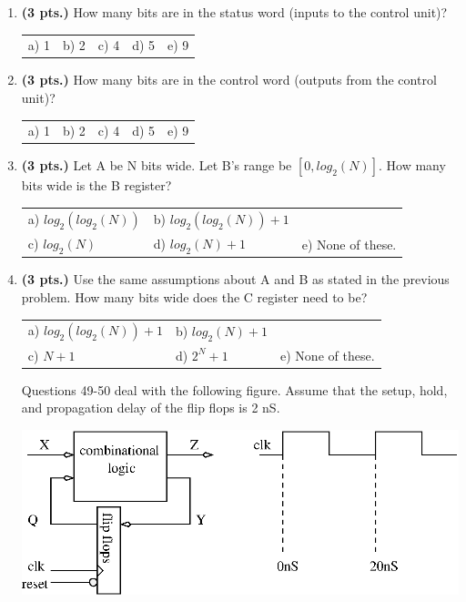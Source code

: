 \documentclass{article}
\begin{document}
\begin{enumerate}
\pagebreak
\item{\bf (3 pts.)} How many bits are in the status word (inputs to the 
control unit)?

\begin{tabular}{p{0.75in}p{0.75in}p{0.75in}p{0.75in}p{0.75in}}
a) 1 & b) 2 & c) 4 & d) 5 & e) 9 \\
\end{tabular}

\item{\bf (3 pts.)} How many bits are in the control word (outputs from the 
control unit)?

\begin{tabular}{p{0.75in}p{0.75in}p{0.75in}p{0.75in}p{0.75in}}
a) 1 & b) 2 & c) 4 & d) 5 & e) 9 \\
\end{tabular}

\item {\bf (3 pts.)} Let A be N bits wide.  Let B's range be $[0,log_2(N)]$.
How many bits wide is the B register?

\begin{tabular}{p{1.30in}p{1.30in}p{2.00in}}
a) $log_2(log_2(N))$ & b) $log_2(log_2(N))+1$ &   \\
c) $log_2(N)$ & d) $log_2(N)+1$ & e) None of these.\\
\end{tabular}

\item {\bf (3 pts.)} Use the same assumptions about A and B as stated in the previous
problem.  How many bits wide does the C register need to be?

\begin{tabular}{p{1.30in}p{1.3in}p{2.00in}}
a) $log_2(log_2(N))+1$ & b) $log_2(N)+1$ &   \\
c) $N+1$ & d) $2^N+1$ & e) None of these.\\
\end{tabular}
\vspace{5mm}

Questions 49-50 deal with the following figure.  Assume that the
setup, hold, and propagation delay of the flip flops is 2 nS.

\includegraphics{./Fig3/fsm.eps}


\end{enumerate}
\end{document}
